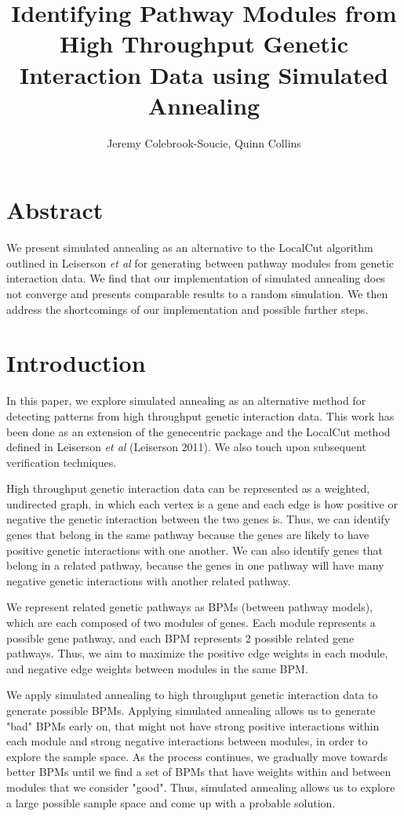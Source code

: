 \documentclass[11pt]{article}
\title{Identifying Pathway Modules from High Throughput Genetic Interaction Data using Simulated Annealing}
\author{Jeremy Colebrook-Soucie, Quinn Collins}
\begin{document}
\maketitle

\section{Abstract}
We present simulated annealing as an alternative to the LocalCut algorithm outlined in Leiserson \textit{et al} for generating between pathway modules from genetic interaction data. We find that our implementation of simulated annealing does not converge and presents comparable results to a random simulation. We then address the shortcomings of our implementation and possible further steps. 

\section{Introduction}

\par In this paper, we explore simulated annealing as an alternative method for detecting patterns from high throughput genetic interaction data. This work has been done as an extension of the genecentric package and the LocalCut method defined in Leiserson \textit{et al} (Leiserson 2011). We also touch upon subsequent verification techniques.

\par High throughput genetic interaction data can be represented as a weighted, undirected graph, in which each vertex is a gene and each edge is how positive or negative the genetic interaction between the two genes is. Thus, we can identify genes that belong in the same pathway because the genes are likely to have positive genetic interactions with one another. We can also identify genes that belong in a related pathway, because the genes in one pathway will have many negative genetic interactions with another related pathway.  

\par We represent related genetic pathways as BPMs (between pathway models), which are each composed of two modules of genes. Each module represents a possible gene pathway, and each BPM represents 2 possible related gene pathways. Thus, we aim to maximize the positive edge weights in each module, and negative edge weights between modules in the same BPM. 

\par We apply simulated annealing to high throughput genetic interaction data to generate possible BPMs. Applying simulated annealing allows us to generate "bad" BPMs early on, that might not have strong positive interactions within each module and strong negative interactions between modules, in order to explore the sample space. As the process continues, we gradually move towards better BPMs until we find a set of BPMs that have weights within and between modules that we consider "good". Thus, simulated annealing allows us to explore a large possible sample space and come up with a probable solution. 
\end{document}
